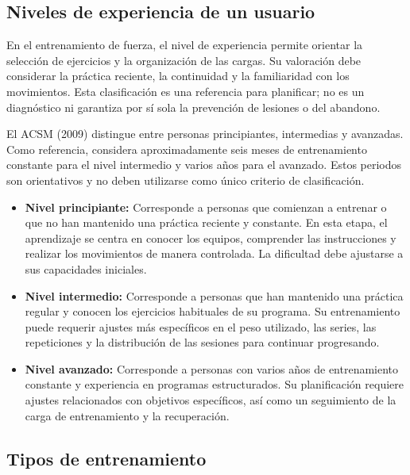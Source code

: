 \subsection{Niveles de experiencia de un usuario}

En el entrenamiento de fuerza, el nivel de experiencia permite orientar la
selección de ejercicios y la organización de las cargas. Su valoración debe
considerar la práctica reciente, la continuidad y la familiaridad con los
movimientos. Esta clasificación es una referencia para planificar; no es un
diagnóstico ni garantiza por sí sola la prevención de lesiones o del abandono.

El ACSM (2009) distingue entre personas principiantes, intermedias y
avanzadas. Como referencia, considera aproximadamente seis meses de
entrenamiento constante para el nivel intermedio y varios años para el
avanzado. Estos periodos son orientativos y no deben utilizarse como único
criterio de clasificación.

\begin{itemize}
    \item \textbf{Nivel principiante:}
    Corresponde a personas que comienzan a entrenar o que no han mantenido una
    práctica reciente y constante. En esta etapa, el aprendizaje se centra en
    conocer los equipos, comprender las instrucciones y realizar los
    movimientos de manera controlada. La dificultad debe ajustarse a sus
    capacidades iniciales.

    \item \textbf{Nivel intermedio:}
    Corresponde a personas que han mantenido una práctica regular y conocen los
    ejercicios habituales de su programa. Su entrenamiento puede requerir
    ajustes más específicos en el peso utilizado, las series, las repeticiones
    y la distribución de las sesiones para continuar progresando.

    \item \textbf{Nivel avanzado:}
    Corresponde a personas con varios años de entrenamiento constante y
    experiencia en programas estructurados. Su planificación requiere ajustes
    relacionados con objetivos específicos, así como un seguimiento de la carga
    de entrenamiento y la recuperación.
\end{itemize}

\subsection{Tipos de entrenamiento}

